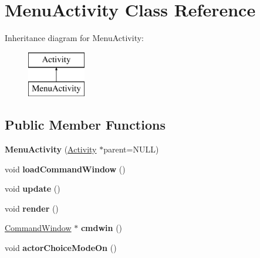 \hypertarget{classMenuActivity}{\section{Menu\-Activity Class Reference}
\label{classMenuActivity}
}
Inheritance diagram for Menu\-Activity\-:\begin{figure}[H]
\begin{center}
\leavevmode
\includegraphics[height=2.000000cm]{classMenuActivity}
\end{center}
\end{figure}
\subsection*{Public Member Functions}
\begin{DoxyCompactItemize}
\item 
\hypertarget{classMenuActivity_a1d4c791e5b9b3eedb57eaa9dd7a794ad}{{\bfseries Menu\-Activity} (\hyperlink{classActivity}{Activity} $\ast$parent=N\-U\-L\-L)}\label{classMenuActivity_a1d4c791e5b9b3eedb57eaa9dd7a794ad}

\item 
\hypertarget{classMenuActivity_a06ee325cd062a218cc5385dae31dcb8c}{void {\bfseries load\-Command\-Window} ()}\label{classMenuActivity_a06ee325cd062a218cc5385dae31dcb8c}

\item 
\hypertarget{classMenuActivity_a2c3d27f669bc15084a965878dfe32181}{void {\bfseries update} ()}\label{classMenuActivity_a2c3d27f669bc15084a965878dfe32181}

\item 
\hypertarget{classMenuActivity_a1e4de0a5320d975b44ca5ad7745dc15b}{void {\bfseries render} ()}\label{classMenuActivity_a1e4de0a5320d975b44ca5ad7745dc15b}

\item 
\hypertarget{classMenuActivity_af5ffdd1998f117c64b23e7261b193768}{\hyperlink{classCommandWindow}{Command\-Window} $\ast$ {\bfseries cmdwin} ()}\label{classMenuActivity_af5ffdd1998f117c64b23e7261b193768}

\item 
\hypertarget{classMenuActivity_a58570dad2334ca37848b33217e10d2b8}{void {\bfseries actor\-Choice\-Mode\-On} ()}\label{classMenuActivity_a58570dad2334ca37848b33217e10d2b8}

\end{DoxyCompactItemize}
